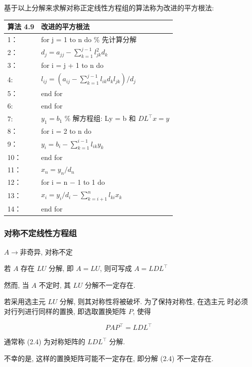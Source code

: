 \documentclass[12pt,a4paper]{article}
\begin{document}
基于以上分解来求解对称正定线性方程组的算法称为改进的平方根法:
\begin{table}  
	\begin{tabular*}{16cm}{ll}  
		\hline  
		算法 4.9 &改进的平方根法\\  
		\hline  
		1：   & for j = 1 to n do \% 先计算分解\\  
		2：   & \qquad $d_{j}=a_{j j}-\sum_{k=1}^{j-1} l_{j k}^{2} d_{k}$\\
		3：   & \qquad for i = j + 1 to n do \\
		4:    & \qquad $l_{i j}=\left(a_{i j}-\sum_{k=1}^{j-1} l_{i k} d_{k} l_{j k}\right) / d_{j}$\\
		5：   & \qquad end for\\
		6:    & end for\\
		7:    & $y_1 = b_1$ \% 解方程组: Ly = b 和 $DL^{\top}x = y$\\
		8：   & for i = 2 to n do \\
		9：   & \qquad $y_{i}=b_{i}-\sum_{k=1}^{i-1} l_{i k} y_{k}$\\
		10：   & end for\\
		11：   & $x_{n}=y_{n} / d_{n}$\\
		12：   & for i = n − 1 to 1 do\\
		13：   & \qquad $x_{i}=y_{i} / d_{i}-\sum_{k=i+1}^{n} l_{k i} x_{k}$\\
		14：   & end for\\
		\hline  
	\end{tabular*}  
\end{table}

\subsubsection{对称不定线性方程组}

$A → $非奇异, 对称不定

若 $A$ 存在 $LU$ 分解, 即 $A = LU$, 则可写成 $A = LDL^{\top}$

然而, 当 $A$ 不定时, 其 $LU$ 分解不一定存在.

若采用选主元 $LU$ 分解, 则其对称性将被破坏. 为了保持对称性, 在选主元
时必须对行列进行同样的置换, 即选取置换矩阵 $P$, 使得

\begin{equation}
P A P^{\top}=L D L^{\top}
\end{equation}

通常称 (2.4) 为对称矩阵的 $LDL^{\top}$ 分解.

不幸的是, 这样的置换矩阵可能不一定存在, 即分解 (2.4) 不一定存在.
\end{document}

